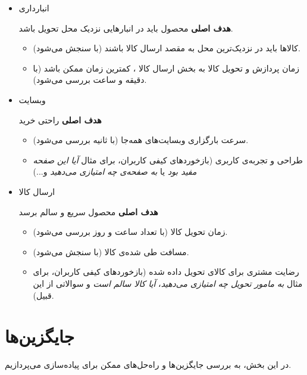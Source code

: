 \documentclass[12pt]{article}
\begin{document}
\begin{itemize}
    \item  انبارداری 
    
    \textbf{هدف اصلی} محصول باید در انبار‌هایی نزدیک محل تحویل باشد.
    \begin{itemize}
        \item 
        کالا‌ها باید در نزدیک‌ترین محل به مقصد ارسال کالا باشند (با سنجش می‌شود).
        
        \item 
        زمان پردازش و تحویل کالا به بخش ارسال کالا ، کمترین زمان ممکن باشد (با دقیقه و ساعت بررسی می‌شود).        
    \end{itemize}
    
    \item وبسایت  
    
    \textbf{هدف اصلی} راحتی خرید
    \begin{itemize}
        \item سرعت بارگزاری وبسایت‌های  همه‌جا (با ثانیه بررسی می‌شود).
        
        \item 
        طراحی و تجربه‌ی کاربری  (بازخورد‌های کیفی کاربران، برای مثال \textit{آیا این صفحه مفید بود} یا \textit{به صفحه‌ی  چه امتیازی می‌دهید} و...)
    \end{itemize}

    \item ارسال کالا 
    
    \textbf{هدف اصلی} محصول سریع و سالم برسد
    \begin{itemize}
        \item 
        زمان تحویل کالا (با تعداد ساعت و روز بررسی می‌شود).
        \item 
        مسافت طی شده‌ی کالا (با  سنجش می‌شود).
        
        \item 
        رضایت مشتری برای کالای تحویل داده شده (بازخورد‌های کیفی کاربران، برای مثال 
        \textit{به مامور تحویل چه امتیازی می‌دهید}،
        \textit{آیا کالا سالم است} و سوالاتی از این قبیل).
    \end{itemize}
\end{itemize}


\section{جایگزین‌ها}
در این بخش، به بررسی جایگزین‌ها و راه‌حل‌های ممکن برای پیاده‌سازی  می‌پردازیم.
\end{document}
